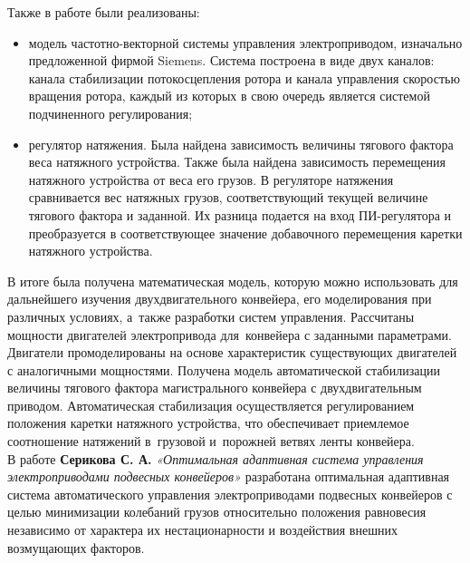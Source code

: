 Также в работе были реализованы:
\begin{itemize}
\item модель частотно-векторной системы управления электроприводом, изначально предложенной фирмой Siemens. Система построена в виде двух каналов: канала стабилизации потокосцепления ротора и канала управления скоростью вращения ротора, каждый из которых в свою очередь является системой подчиненного регулирования;
\item регулятор натяжения. Была найдена зависимость величины тягового фактора веса натяжного устройства. Также была найдена зависимость перемещения натяжного устройства от веса его грузов. В регуляторе натяжения сравнивается вес натяжных грузов, соответствующий текущей величине тягового фактора и заданной. Их разница подается на вход ПИ-регулятора и преобразуется в соответствующее значение добавочного перемещения каретки натяжного устройства. 
\end{itemize}

В итоге была получена математическая модель, которую можно использовать для дальнейшего изучения двухдвигательного конвейера, его моделирования при различных условиях, а~также разработки систем управления. Рассчитаны мощности двигателей электропривода для~конвейера с заданными параметрами. Двигатели промоделированы на основе характеристик существующих двигателей с аналогичными мощностями. Получена модель автоматической стабилизации величины тягового фактора магистрального конвейера с двухдвигательным приводом. Автоматическая стабилизация осуществляется регулированием положения каретки натяжного устройства, что обеспечивает приемлемое соотношение натяжений в~грузовой и~порожней ветвях ленты конвейера.\\

В работе \textbf{Серикова С. А.} \textit{«Оптимальная адаптивная система управления электроприводами подвесных конвейеров»} \cite{sserikov} разработана оптимальная адаптивная система автоматического управления электроприводами подвесных конвейеров с целью минимизации колебаний грузов относительно положения равновесия независимо от характера их нестационарности и воздействия внешних возмущающих факторов.


